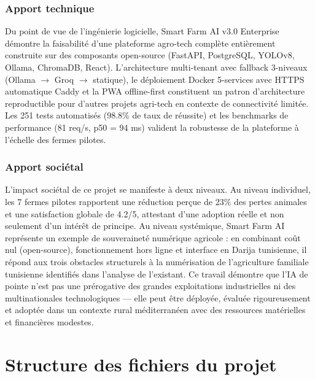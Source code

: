 \subsection*{Apport technique}
Du point de vue de l'ingénierie logicielle, Smart Farm AI v3.0 Enterprise
démontre la faisabilité d'une plateforme agro-tech complète entièrement
construite sur des composants open-source (FastAPI, PostgreSQL, YOLOv8,
Ollama, ChromaDB, React). L'architecture multi-tenant avec fallback
3-niveaux (Ollama $\rightarrow$ Groq $\rightarrow$ statique), le déploiement Docker 5-services
avec HTTPS automatique Caddy et la PWA offline-first constituent un patron
d'architecture reproductible pour d'autres projets agri-tech en contexte
de connectivité limitée. Les 251 tests automatisés (98.8\% de taux de
réussite) et les benchmarks de performance (81 req/s, p50 = 94 ms) valident
la robustesse de la plateforme à l'échelle des fermes pilotes.

\subsection*{Apport sociétal}
L'impact sociétal de ce projet se manifeste à deux niveaux. Au niveau
individuel, les 7 fermes pilotes rapportent une réduction perçue de 23\%
des pertes animales et une satisfaction globale de 4.2/5, attestant d'une
adoption réelle et non seulement d'un intérêt de principe. Au niveau systémique,
Smart Farm AI représente un exemple de souveraineté numérique agricole :
en combinant coût nul (open-source), fonctionnement hors ligne et interface
en Darija tunisienne, il répond aux trois obstacles structurels à la
numérisation de l'agriculture familiale tunisienne identifiés dans l'analyse
de l'existant. Ce travail démontre que l'IA de pointe n'est pas une prérogative
des grandes exploitations industrielles ni des multinationales technologiques —
elle peut être déployée, évaluée rigoureusement et adoptée dans un contexte
rural méditerranéen avec des ressources matérielles et financières modestes.

\appendix

\chapter{Structure des fichiers du projet}
\label{ann:structure}

